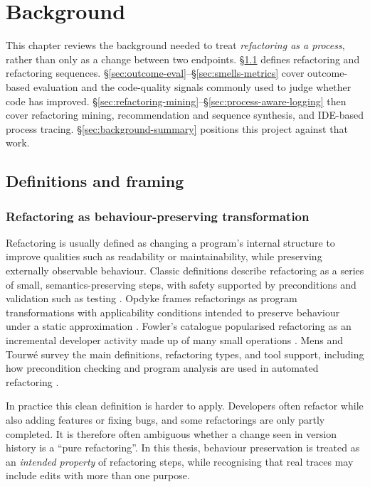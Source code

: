 \chapter{Background}
\label{ch:background}

This chapter reviews the background needed to treat \emph{refactoring as a process}, rather than only as a change between two endpoints. \S\ref{sec:def-framing} defines refactoring and refactoring sequences. \S\ref{sec:outcome-eval}--\S\ref{sec:smells-metrics} cover outcome-based evaluation and the code-quality signals commonly used to judge whether code has improved. \S\ref{sec:refactoring-mining}--\S\ref{sec:process-aware-logging} then cover refactoring mining, recommendation and sequence synthesis, and IDE-based process tracing. \S\ref{sec:background-summary} positions this project against that work.

\section{Definitions and framing}
\label{sec:def-framing}

\subsection{Refactoring as behaviour-preserving transformation}
Refactoring is usually defined as changing a program's internal structure to improve qualities such as readability or maintainability, while preserving externally observable behaviour. Classic definitions describe refactoring as a series of small, semantics-preserving steps, with safety supported by preconditions and validation such as testing \cite{opdyke1992refactoring,fowler1999refactoring,fowler2018refactoring}. Opdyke frames refactorings as program transformations with applicability conditions intended to preserve behaviour under a static approximation \cite{opdyke1992refactoring}. Fowler's catalogue popularised refactoring as an incremental developer activity made up of many small operations \cite{fowler1999refactoring,fowler2018refactoring}. Mens and Tourw\'e survey the main definitions, refactoring types, and tool support, including how precondition checking and program analysis are used in automated refactoring \cite{mens2004survey}.

In practice this clean definition is harder to apply. Developers often refactor while also adding features or fixing bugs, and some refactorings are only partly completed. It is therefore often ambiguous whether a change seen in version history is a ``pure refactoring''. In this thesis, behaviour preservation is treated as an \emph{intended property} of refactoring steps, while recognising that real traces may include edits with more than one purpose.

